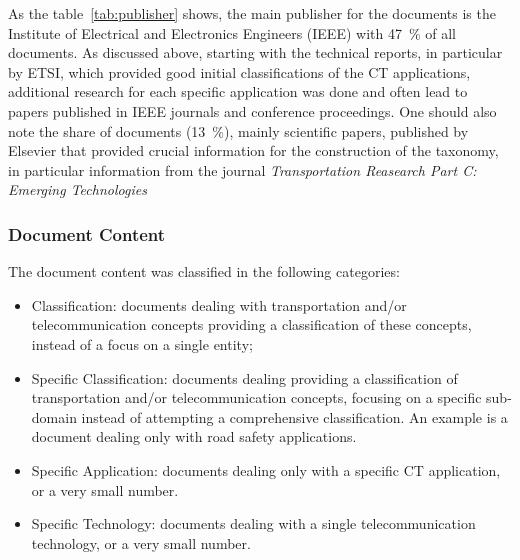 As the table~\ref{tab:publisher} shows, the main publisher for the documents is the Institute of Electrical and Electronics Engineers (IEEE) with 47~\% of all documents. %
As discussed above, starting with the technical reports, in particular by \acrshort{ETSI}, which provided good initial classifications of the \acrshort{CT} applications, additional research for each specific application was done and often lead to papers published in IEEE journals and conference proceedings. One should also note the share of documents (13~\%), mainly scientific papers, published by Elsevier that provided crucial information for the construction of the taxonomy, in particular information from the journal \emph{Transportation Reasearch Part C: Emerging Technologies}

\subsubsection{Document Content}

The document content was classified in the following categories: 
\begin{itemize}
\item Classification: documents dealing with transportation and/or telecommunication concepts providing a classification of these concepts, instead of a focus on a single entity;
\item Specific Classification: documents dealing providing a classification of transportation and/or telecommunication concepts, focusing on a specific sub-domain instead of attempting a comprehensive classification. An example is a document dealing only with road safety applications.  
\item Specific Application: documents dealing only with a specific \acrshort{CT} application, or a very small number.
\item Specific Technology: documents dealing with a single telecommunication technology, or a very small number. 
\end{itemize}


